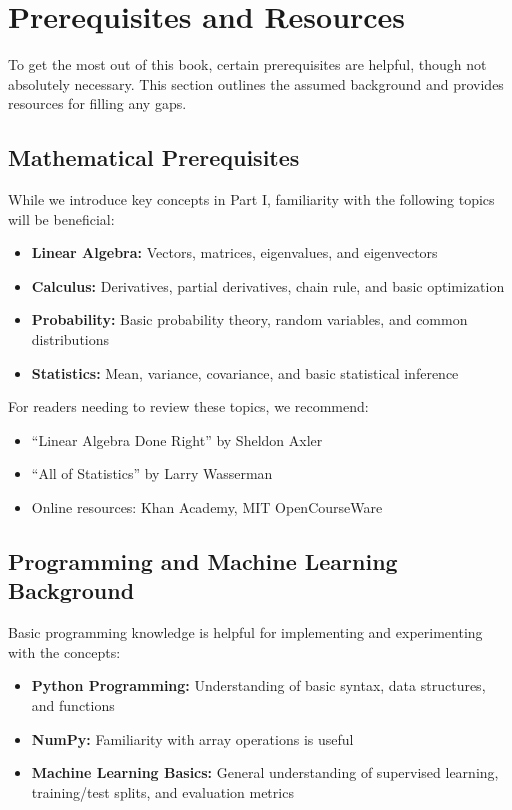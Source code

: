 
\section{Prerequisites and Resources }
\label{sec:prerequisites}

To get the most out of this book, certain prerequisites are helpful, though not absolutely necessary. This section outlines the assumed background and provides resources for filling any gaps.

\subsection{Mathematical Prerequisites}

While we introduce key concepts in Part I, familiarity with the following topics will be beneficial:

\begin{itemize}
    \item \textbf{Linear Algebra:} Vectors, matrices, eigenvalues, and eigenvectors
    \item \textbf{Calculus:} Derivatives, partial derivatives, chain rule, and basic optimization
    \item \textbf{Probability:} Basic probability theory, random variables, and common distributions
    \item \textbf{Statistics:} Mean, variance, covariance, and basic statistical inference
\end{itemize}

For readers needing to review these topics, we recommend:
\begin{itemize}
    \item ``Linear Algebra Done Right'' by Sheldon Axler
    \item ``All of Statistics'' by Larry Wasserman
    \item Online resources: Khan Academy, MIT OpenCourseWare
\end{itemize}

\subsection{Programming and Machine Learning Background}

Basic programming knowledge is helpful for implementing and experimenting with the concepts:

\begin{itemize}
    \item \textbf{Python Programming:} Understanding of basic syntax, data structures, and functions
    \item \textbf{NumPy:} Familiarity with array operations is useful
    \item \textbf{Machine Learning Basics:} General understanding of supervised learning, training/test splits, and evaluation metrics
\end{itemize}


